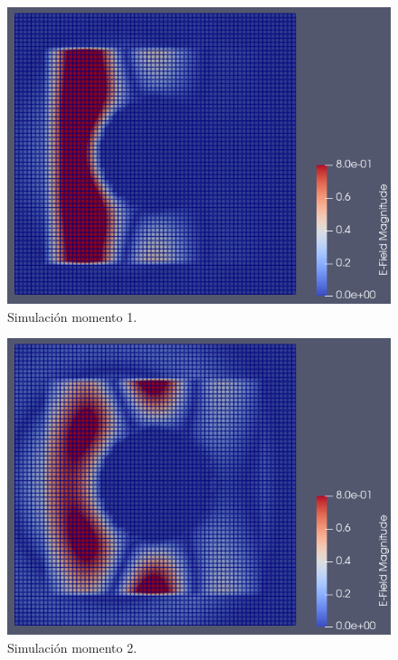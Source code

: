 \documentclass[
    11pt,
    spanish,
    a4paper
]{article}
\begin{document}
\begin{figure}[htbp]
	\centering
	\includegraphics[width=\textwidth]{./img/impacto.png}
	\caption{Simulación momento 1.}
	\label{fig:sim4}
\end{figure}

\begin{figure}[htbp]
	\centering
	\includegraphics[width=\textwidth]{./img/mitad.png}
	\caption{Simulación momento 2.}
	\label{fig:sim5}
\end{figure}
\end{document}
